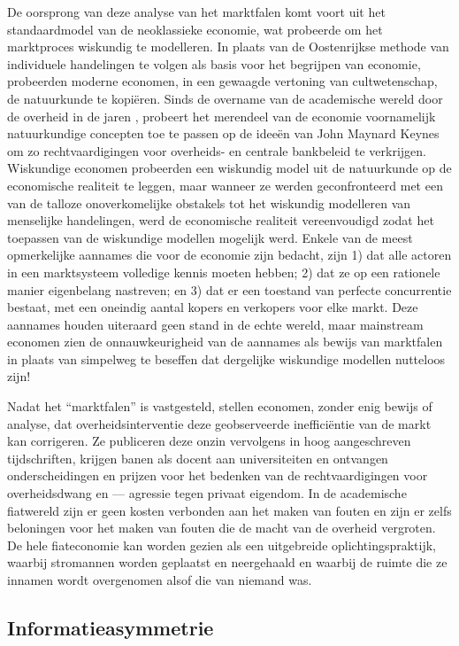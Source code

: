De oorsprong van deze analyse van het marktfalen komt voort uit het standaardmodel van de neoklassieke economie, wat probeerde om het marktproces wiskundig te modelleren. In plaats van de Oostenrijkse methode van individuele handelingen te volgen als basis voor het begrijpen van economie, probeerden moderne economen, in een gewaagde vertoning van cultwetenschap, de natuurkunde te kopiëren. Sinds de overname van de academische wereld door de overheid in de jaren , probeert het merendeel van de economie voornamelijk natuurkundige concepten toe te passen op de ideeën van John Maynard Keynes om zo rechtvaardigingen voor overheids- en centrale bankbeleid te verkrijgen. Wiskundige economen probeerden een wiskundig model uit de natuurkunde op de economische realiteit te leggen, maar wanneer ze werden geconfronteerd met een van de talloze onoverkomelijke obstakels tot het wiskundig modelleren van menselijke handelingen, werd de economische realiteit vereenvoudigd zodat het toepassen van de wiskundige modellen mogelijk werd. Enkele van de meest opmerkelijke aannames die voor de economie zijn bedacht, zijn 1) dat alle actoren in een marktsysteem volledige kennis moeten hebben; 2) dat ze op een rationele manier eigenbelang nastreven; en 3) dat er een toestand van perfecte concurrentie bestaat, met een oneindig aantal kopers en verkopers voor elke markt. Deze aannames houden uiteraard geen stand in de echte wereld, maar mainstream economen zien de onnauwkeurigheid van de aannames als bewijs van marktfalen in plaats van simpelweg te beseffen dat dergelijke wiskundige modellen nutteloos zijn!

Nadat het ``marktfalen'' is vastgesteld, stellen economen, zonder enig bewijs of analyse, dat overheidsinterventie deze geobserveerde inefficiëntie van de markt kan corrigeren. Ze publiceren deze onzin vervolgens in hoog aangeschreven tijdschriften, krijgen banen als docent aan universiteiten en ontvangen onderscheidingen en prijzen voor het bedenken van de rechtvaardigingen voor overheidsdwang en --- agressie tegen privaat eigendom. In de academische fiatwereld zijn er geen kosten verbonden aan het maken van fouten en zijn er zelfs beloningen voor het maken van fouten die de macht van de overheid vergroten.\autocite{185} De hele fiateconomie kan worden gezien als een uitgebreide oplichtingspraktijk, waarbij stromannen worden geplaatst en neergehaald en waarbij de ruimte die ze innamen wordt overgenomen alsof die van niemand was.

\subsection{Informatieasymmetrie}

